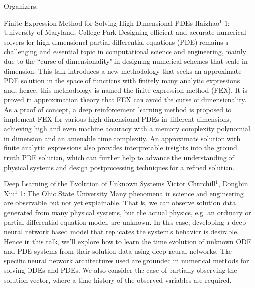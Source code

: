 \label{mini26}

\miniabs
{}
{Organizers: }
{}

\vspace{2ex}
\abs
{Finite Expression Method for Solving High-Dimensional PDEs}
{Haizhao$^{1}$}
{1: University of Maryland, College Park}
{Designing efficient and accurate numerical solvers for high-dimensional partial differential equations (PDE) remains a challenging and essential topic in computational science and engineering, mainly due to the ``curse of dimensionality" in designing numerical schemes that scale in dimension. This talk introduces a new methodology that seeks an approximate PDE solution in the space of functions with finitely many analytic expressions and, hence, this methodology is named the finite expression method (FEX). It is proved in approximation theory that FEX can avoid the curse of dimensionality. As a proof of concept, a deep reinforcement learning method is proposed to implement FEX for various high-dimensional PDEs in different dimensions, achieving high and even machine accuracy with a memory complexity polynomial in dimension and an amenable time complexity. An approximate solution with finite analytic expressions also provides interpretable insights into the ground truth PDE solution, which can further help to advance the understanding of physical systems and design postprocessing techniques for a refined solution.}


\vspace{1.5ex}
\abs
{Deep Learning of the Evolution of Unknown Systems}
{Victor Churchill$^1$, Dongbin Xiu$^1$}
{1: The Ohio State University}
{Many phenomena in science and engineering are observable but not yet explainable. That is, we can observe solution data generated from many physical systems, but the actual physics, e.g. an ordinary or partial differential equation model, are unknown. In this case, developing a deep neural network based model that replicates the system’s behavior is desirable. Hence in this talk, we’ll explore how to learn the time evolution of unknown ODE and PDE systems from their solution data using deep neural networks. The specific neural network architectures used are grounded in numerical methods for solving ODEs and PDEs. We also consider the case of partially observing the solution vector, where a time history of the observed variables are required.}


